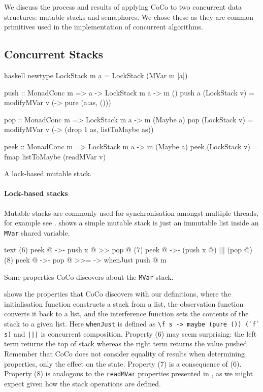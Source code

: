 We discuss the process and results of applying CoCo to two concurrent
data structures: mutable stacks and semaphores.  We chose these as
they are common primitives used in the implementation of concurrent
algorithms.

\subsection{Concurrent Stacks}
\label{sec:coco-cases-stack}

\begin{listing}
\centering
\begin{cminted}{haskell}
newtype LockStack m a = LockStack (MVar m [a])

push :: MonadConc m => a -> LockStack m a -> m ()
push a (LockStack v) = modifyMVar v (\as -> pure (a:as, ()))

pop :: MonadConc m => LockStack m a -> m (Maybe a)
pop (LockStack v) = modifyMVar v (\as -> (drop 1 as, listToMaybe as))

peek :: MonadConc m => LockStack m a -> m (Maybe a)
peek (LockStack v) = fmap listToMaybe (readMVar v)
\end{cminted}
\caption{A lock-based mutable stack.}\label{lst:lockstack}
\end{listing}

\paragraph{Lock-based stacks}
Mutable stacks are commonly used for synchronisation amongst multiple
threads, for example see \cite{dodds2015}.  shows
a simple mutable stack is just an immutable list inside an \verb|MVar|
shared variable.

\begin{listing}
\centering
\begin{cminted}{text}
(6)  peek @  ->-  push x @ >> pop @
(7)  peek @  ->-  (push x @) ||| (pop @)
(8)  peek @  ->-  pop @ >>= \m -> whenJust push @ m
\end{cminted}
\caption{Some properties CoCo discovers about the \texttt{MVar} stack.}\label{lst:lockstack2}
\end{listing}

 shows the properties that CoCo discovers with
our definitions, where the initialisation function constructs a stack
from a list, the observation function converts it back to a list, and
the interference function sets the contents of the stack to a given
list.  Here \verb|whenJust| is defined as
\verb|\f s -> maybe (pure ()) (`f` s)| and \verb#|||# is concurrent
composition.  Property (6) may seem surprising: the left term returns
the top of stack whereas the right term returns the value pushed.
Remember that CoCo does not consider equality of results when
determining properties, only the effect on the state.  Property (7) is
a consequence of (6).  Property (8) is analogous to the
\verb|readMVar| properties presented in , as we
might expect given how the stack operations are defined.

